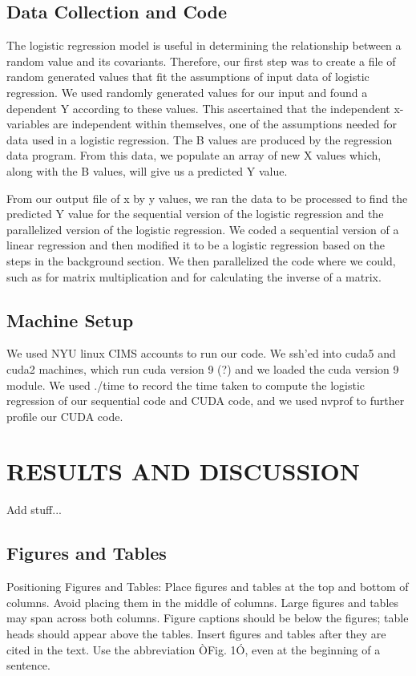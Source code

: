 \documentclass[letterpaper, 10 pt, conference]{ieeeconf}  %
\begin{document}
\subsection{Data Collection and Code}
The logistic regression model is useful in determining the relationship between a random value and its covariants. Therefore, our first step was to create a file of random generated values that fit the assumptions of input data of logistic regression. We used randomly generated values for our input and found a dependent Y according to these values. This ascertained that the independent x-variables are independent within themselves, one of the assumptions needed for data used in a logistic regression. The B values are produced by the regression data program. From this data, we populate an array of new X values which, along with the B values, will give us a predicted Y value. 

From our output file of x by y values, we ran the data to be processed to find the predicted Y value for the sequential version of the logistic regression and the parallelized version of the logistic regression. We coded a sequential version of a linear regression and then modified it to be a logistic regression based on the steps in the background section. We then parallelized the code where we could, such as for matrix multiplication and for calculating the inverse of a matrix. 

\subsection{Machine Setup}

We used NYU linux CIMS accounts to run our code. We ssh'ed into cuda5 and cuda2 machines, which run cuda version 9 (?) and we loaded the cuda version 9 module. We used ./time to record the time taken to compute the logistic regression of our sequential code and CUDA code, and we used nvprof to further profile our CUDA code. 

\section{RESULTS AND DISCUSSION}
Add stuff...

\subsection{Figures and Tables}

Positioning Figures and Tables: Place figures and tables at the top and bottom of columns. Avoid placing them in the middle of columns. Large figures and tables may span across both columns. Figure captions should be below the figures; table heads should appear above the tables. Insert figures and tables after they are cited in the text. Use the abbreviation ÒFig. 1Ó, even at the beginning of a sentence.
\end{document}
